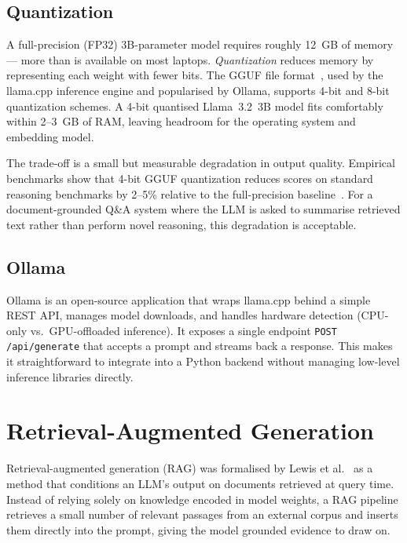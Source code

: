 \subsection{Quantization}

A full-precision (FP32) 3B-parameter model requires roughly 12~GB of memory — more than is available on most laptops. \emph{Quantization} reduces memory by representing each weight with fewer bits. The GGUF file format~\cite{gerganov2023llama}, used by the llama.cpp inference engine and popularised by Ollama, supports 4-bit and 8-bit quantization schemes. A 4-bit quantised Llama~3.2~3B model fits comfortably within 2--3~GB of RAM, leaving headroom for the operating system and embedding model.

The trade-off is a small but measurable degradation in output quality. Empirical benchmarks show that 4-bit GGUF quantization reduces scores on standard reasoning benchmarks by 2--5\% relative to the full-precision baseline~\cite{dettmers2023qlora}. For a document-grounded Q\&A system where the LLM is asked to summarise retrieved text rather than perform novel reasoning, this degradation is acceptable.

\subsection{Ollama}

Ollama is an open-source application that wraps llama.cpp behind a simple REST API, manages model downloads, and handles hardware detection (CPU-only vs.\ GPU-offloaded inference). It exposes a single endpoint \texttt{POST /api/generate} that accepts a prompt and streams back a response. This makes it straightforward to integrate into a Python backend without managing low-level inference libraries directly.

\section{Retrieval-Augmented Generation}
\label{sec:bg-rag}

Retrieval-augmented generation (RAG) was formalised by Lewis et al.~\cite{lewis2020rag} as a method that conditions an LLM's output on documents retrieved at query time. Instead of relying solely on knowledge encoded in model weights, a RAG pipeline retrieves a small number of relevant passages from an external corpus and inserts them directly into the prompt, giving the model grounded evidence to draw on.

